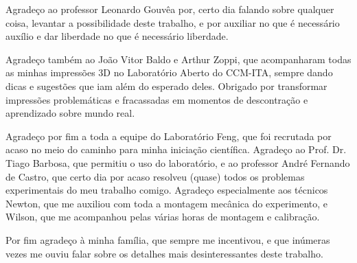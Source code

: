 Agradeço ao professor Leonardo Gouvêa por, certo dia falando sobre qualquer coisa, levantar a possibilidade deste trabalho, e por auxiliar no que é necessário auxílio e dar liberdade no que é necessário liberdade.

Agradeço também ao João Vitor Baldo e Arthur Zoppi, que acompanharam todas as minhas impressões 3D no Laboratório Aberto do CCM-ITA, sempre dando dicas e sugestões que iam além do esperado deles. Obrigado por transformar impressões problemáticas e fracassadas em momentos de descontração e aprendizado sobre mundo real.

Agradeço por fim a toda a equipe do Laboratório Feng, que foi recrutada por acaso no meio do caminho para minha iniciação científica. Agradeço ao Prof. Dr. Tiago Barbosa, que permitiu o uso do laboratório, e ao professor André Fernando de Castro, que certo dia por acaso resolveu (quase) todos os problemas experimentais do meu trabalho comigo. Agradeço especialmente aos técnicos Newton, que me auxiliou com toda a montagem mecânica do experimento, e Wilson, que me acompanhou pelas várias horas de montagem e calibração.

Por fim agradeço à minha família, que sempre me incentivou, e que inúmeras vezes me ouviu falar sobre os detalhes mais desinteressantes deste trabalho.